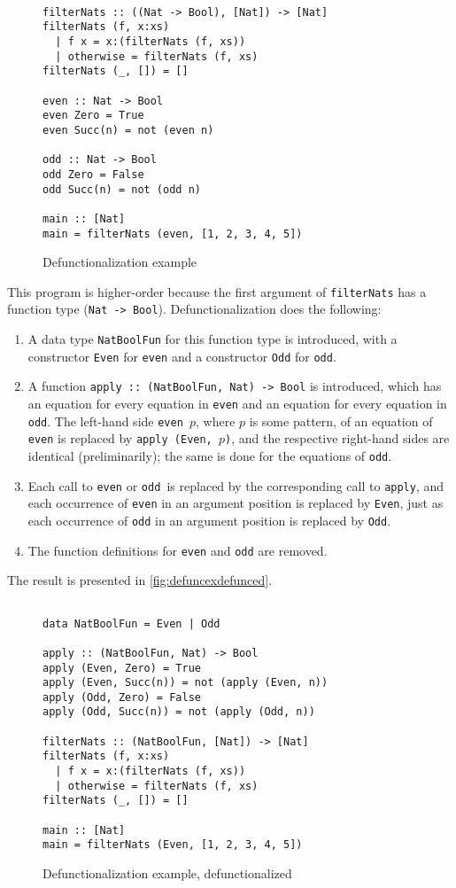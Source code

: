 \begin{figure}
\begin{lstlisting}

filterNats :: ((Nat -> Bool), [Nat]) -> [Nat]
filterNats (f, x:xs)
  | f x = x:(filterNats (f, xs))
  | otherwise = filterNats (f, xs)
filterNats (_, []) = []

even :: Nat -> Bool
even Zero = True
even Succ(n) = not (even n)

odd :: Nat -> Bool
odd Zero = False
odd Succ(n) = not (odd n)

main :: [Nat]
main = filterNats (even, [1, 2, 3, 4, 5])

\end{lstlisting}
\caption{Defunctionalization example}
\label{fig:defuncex}
\end{figure}

This program is higher-order because the first argument of \texttt{filterNats} has a function type (\texttt{Nat -> Bool}). Defunctionalization does the following:
\begin{enumerate}
\item  A data type \texttt{NatBoolFun} for this function type is introduced, with a constructor \texttt{Even} for \texttt{even} and a constructor \texttt{Odd} for \texttt{odd}.
\item A function \texttt{apply :: (NatBoolFun, Nat) -> Bool} is introduced, which has an equation for every equation in \texttt{even} and an equation for every equation in \texttt{odd}. The left-hand side \texttt{even $p$}, where $p$ is some pattern, of an equation of \texttt{even} is replaced by \texttt{apply (Even, $p$)}, and the respective right-hand sides are identical (preliminarily); the same is done for the equations of \texttt{odd}.
\item Each call to \texttt{even} or \texttt{odd }is replaced by the corresponding call to \texttt{apply}, and each occurrence of \texttt{even} in an argument position is replaced by \texttt{Even}, just as each occurrence of \texttt{odd} in an argument position is replaced by \texttt{Odd}.
\item The function definitions for \texttt{even} and \texttt{odd} are removed.
\end{enumerate}
The result is presented in \autoref{fig:defuncexdefunced}.

\begin{figure}
\begin{lstlisting}

data NatBoolFun = Even | Odd

apply :: (NatBoolFun, Nat) -> Bool
apply (Even, Zero) = True
apply (Even, Succ(n)) = not (apply (Even, n))
apply (Odd, Zero) = False
apply (Odd, Succ(n)) = not (apply (Odd, n))

filterNats :: (NatBoolFun, [Nat]) -> [Nat]
filterNats (f, x:xs)
  | f x = x:(filterNats (f, xs))
  | otherwise = filterNats (f, xs)
filterNats (_, []) = []

main :: [Nat]
main = filterNats (Even, [1, 2, 3, 4, 5])

\end{lstlisting}
\caption{Defunctionalization example, defunctionalized}
\label{fig:defuncexdefunced}
\end{figure}

